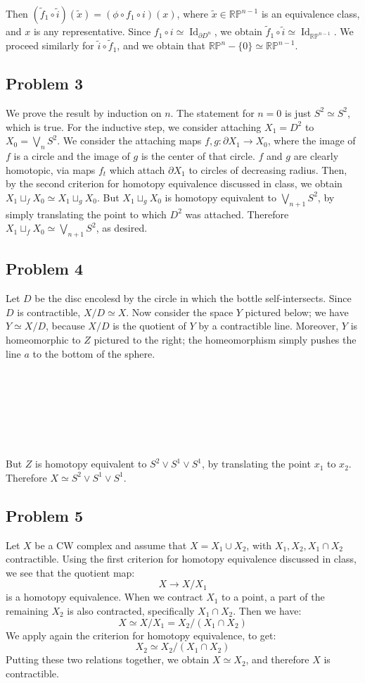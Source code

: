 \documentclass[12 pt]{article}
\newcommand{\p}{\partial}
\DeclareMathOperator{\id}{Id}
\begin{document}
Then $(\tilde f_1 \circ \tilde i) (\tilde x) = (\phi \circ f_1 \circ i)(x)$, where $\tilde x \in \mathbb{RP}^{n-1}$ is an equivalence class, and $x$ is any representative. Since $f_1 \circ i \simeq \id_{\p D^n}$, we obtain $\tilde f_1 \circ \tilde i \simeq \id_{\mathbb{RP}^{n-1}}$. We proceed similarly for $\tilde i \circ \tilde f_1$, and we obtain that $\mathbb{RP}^n - \{0\} \simeq  \mathbb{RP}^{n-1}$. 


\subsection*{Problem 3}
We prove the result by induction on $n$. The statement for $n=0$ is just $S^2 \simeq S^2$, which is true. For the inductive step, we consider attaching $X_1 = D^2$ to $X_0 = \bigvee_n S^2$. We consider the attaching maps $f, g: \p X_1 \to X_0$, where the image of $f$ is a circle and the image of $g$ is the center of that circle. $f$ and $g$ are clearly homotopic, via maps $f_t$ which attach $\p X_1$ to circles of decreasing radius. Then, by the second criterion for homotopy equivalence discussed in class, we obtain $X_1 \sqcup_f X_0 \simeq X_1 \sqcup_g X_0$. But $ X_1 \sqcup_g X_0$ is homotopy equivalent to $\bigvee_{n+1} S^2$, by simply translating the point to which $D^2$ was attached. Therefore $X_1 \sqcup_f X_0 \simeq \bigvee_{n+1} S^2$, as desired.


\subsection*{Problem 4}
Let $D$ be the disc encolesd by the circle in which the bottle self-intersects. Since $D$ is contractible, $X/D \simeq X$. Now consider the space $Y$ pictured below; we have $Y \simeq X/D$, because $X/D$ is the quotient of $Y$ by a contractible line. Moreover, $Y$ is homeomorphic to $Z$ pictured to the right; the homeomorphism simply pushes the line $a$ to the bottom of the sphere.
\\
\\
\\
\\
\\
\\
\\
\\
But $Z$ is homotopy equivalent to $S^2 \vee S^1 \vee S^1$, by translating the point $x_1$ to $x_2$. Therefore $X \simeq S^2 \vee S^1 \vee S^1$.


\subsection*{Problem 5}
Let $X$ be a CW complex and assume that $X = X_1 \cup X_2$, with $X_1, X_2, X_1 \cap X_2$ contractible. Using the first criterion for homotopy equivalence discussed in class, we see that the quotient map:
\[      X \to X/X_1    \]
is a homotopy equivalence. When we contract $X_1$ to a point, a part of the remaining $X_2$ is also contracted, specifically $X_1 \cap X_2$. Then we have:
\[      X \simeq X/X_1 = X_2 / (X_1 \cap X_2)      \]
We apply again the criterion for homotopy equivalence, to get:
\[      X_2 \simeq  X_2 / (X_1 \cap X_2)          \]
Putting these two relations together, we obtain $X \simeq X_2$, and therefore $X$ is contractible.
\end{document}
